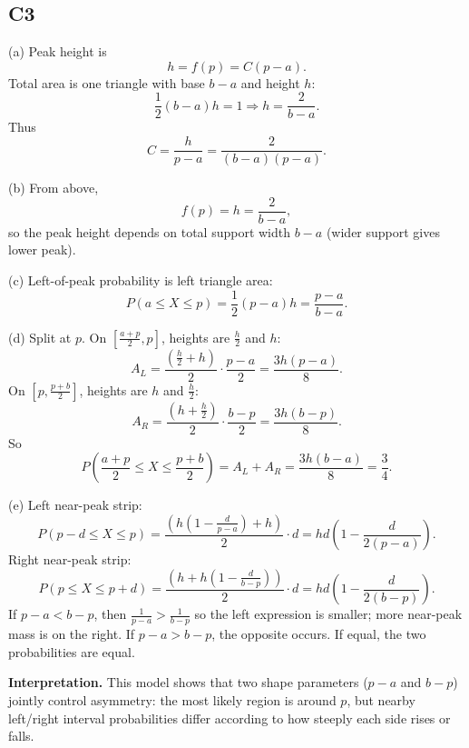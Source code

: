 \subsection*{C3}
(a) Peak height is
\[
h=f(p)=C(p-a).
\]
Total area is one triangle with base $b-a$ and height $h$:
\[
\frac12(b-a)h=1
\Rightarrow
h=\frac{2}{b-a}.
\]
Thus
\[
C=\frac{h}{p-a}=\frac{2}{(b-a)(p-a)}.
\]

(b) From above,
\[
f(p)=h=\frac{2}{b-a},
\]
so the peak height depends on total support width $b-a$ (wider support gives lower peak).

(c) Left-of-peak probability is left triangle area:
\[
P(a\le X\le p)=\frac12(p-a)h=\frac{p-a}{b-a}.
\]

(d) Split at $p$.
On $\left[\frac{a+p}{2},p\right]$, heights are $\frac h2$ and $h$:
\[
A_L=\frac{\left(\frac h2+h\right)}{2}\cdot\frac{p-a}{2}=\frac{3h(p-a)}{8}.
\]
On $\left[p,\frac{p+b}{2}\right]$, heights are $h$ and $\frac h2$:
\[
A_R=\frac{\left(h+\frac h2\right)}{2}\cdot\frac{b-p}{2}=\frac{3h(b-p)}{8}.
\]
So
\[
P\!\left(\frac{a+p}{2}\le X\le\frac{p+b}{2}\right)=A_L+A_R=\frac{3h(b-a)}{8}=\frac34.
\]

(e) Left near-peak strip:
\[
P(p-d\le X\le p)=\frac{\left(h\left(1-\frac{d}{p-a}\right)+h\right)}{2}\cdot d
=hd\left(1-\frac{d}{2(p-a)}\right).
\]
Right near-peak strip:
\[
P(p\le X\le p+d)=\frac{\left(h+h\left(1-\frac{d}{b-p}\right)\right)}{2}\cdot d
=hd\left(1-\frac{d}{2(b-p)}\right).
\]
If $p-a<b-p$, then $\frac{1}{p-a}>\frac{1}{b-p}$ so the left expression is smaller; more near-peak mass is on the right. If $p-a>b-p$, the opposite occurs. If equal, the two probabilities are equal.

\textbf{Interpretation.}
This model shows that two shape parameters ($p-a$ and $b-p$) jointly control asymmetry: the most likely region is around $p$, but nearby left/right interval probabilities differ according to how steeply each side rises or falls.


